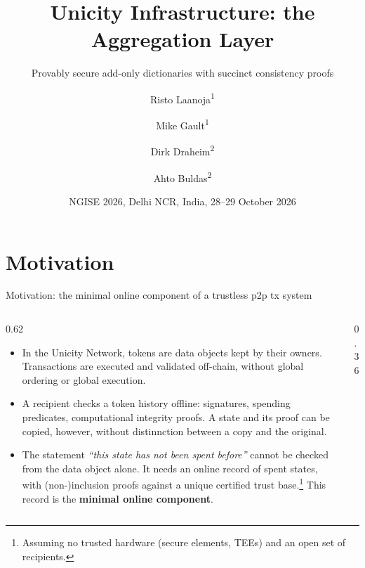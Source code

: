 \documentclass[aspectratio=169,10pt]{beamer}
\title{Unicity Infrastructure: the Aggregation Layer}
\subtitle{Provably secure add-only dictionaries with succinct consistency proofs}
\author{Risto Laanoja\textsuperscript{1} \and Mike Gault\textsuperscript{1} \and Dirk Draheim\textsuperscript{2} \and Ahto Buldas\textsuperscript{2}}
\institute{\textsuperscript{1}Unicity Labs \qquad \textsuperscript{2}Tallinn University of Technology}
\date{NGISE 2026, Delhi NCR, India, 28--29 October 2026}
\begin{document}
\maketitle

\section{Motivation}

\begin{frame}{Motivation: the minimal online component of a trustless p2p tx system}
\begin{columns}[T]
\begin{column}{0.62\textwidth}
\small
\begin{itemize}
  \item In the Unicity Network, tokens are data objects kept by their owners. Transactions are executed and validated off-chain, without global ordering or global execution.
  \item A recipient checks a token history offline: signatures, spending predicates, computational integrity proofs. A state and its proof can be copied, however, without distinnction between a copy and the original.
  \item The statement \emph{``this state has not been spent before''} cannot be checked from the data object alone. It needs an online record of spent states, with (non-)inclusion proofs against a unique certified trust base.\footnote[frame]{Assuming no trusted hardware (secure elements, TEEs) and an open set of recipients.} This record is the \textbf{minimal online component}.
\end{itemize}
\end{column}
\begin{column}{0.36\textwidth}
\centering
{}
\end{column}
\end{columns}
\end{frame}
\end{document}
